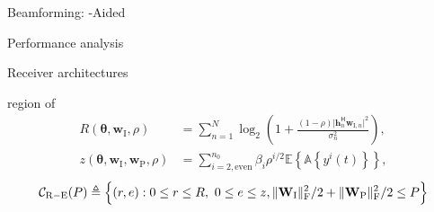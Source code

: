 \documentclass[presentation,xcolor={table},9pt]{beamer}
\begin{document}
\begin{section}{Beamforming: -Aided }
	\begin{frame}{Performance analysis}
		\begin{block}{Receiver architectures}
			\vspace{-0.5cm}
			\begin{figure}
				\centering
			\end{figure}
		\end{block}
		\begin{block}{ region of }
			\vspace{-0.25cm}
			\begin{align*}
				R(\boldsymbol{\theta},\mathbf{w}_{\mathrm{I}},\rho) &= \sum_{n=1}^N{\log_2\left(1+\frac{(1-\rho)\lvert \mathbf{h}_{n}^\mathsf{H}\mathbf{w}_{\mathrm{I},n} \rvert^2}{\sigma_n^2}\right)},\\
				z(\boldsymbol{\theta},\mathbf{w}_{\mathrm{I}},\mathbf{w}_{\mathrm{P}},\rho) &= \sum_{i=2,\text{even}}^{n_0}{\beta_i}{\rho^{i/2}}{\mathbb{E}\left\{\mathbb{A}\left\{y^i(t)\right\}\right\}},
			\end{align*}
			\begin{equation*}
				\mathcal{C}_\mathrm{R-E}(P)\triangleq \Bigl\{(r,e) : 0 \le r \le R, \ 0 \le e \le z, \lVert{\mathbf{W}_{\mathrm{I}}}\rVert _\mathrm{F}^2/2 + \lVert{\mathbf{W}_{\mathrm{P}}}\rVert _\mathrm{F}^2/2 \le P \Bigr\}
			\end{equation*}
		\end{block}
	\end{frame}


\end{section}
\end{document}
